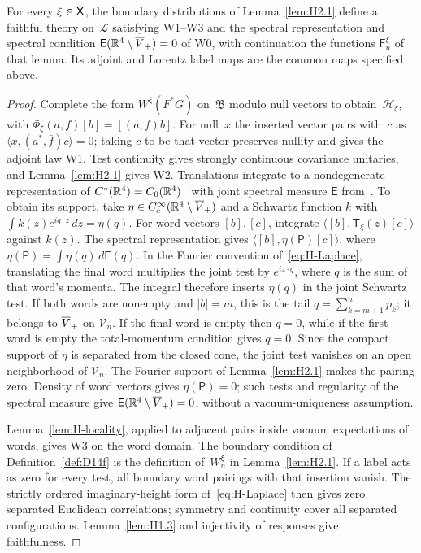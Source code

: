 \begin{lemma}\label{lem:H-fields}
For every $\xi\in\mathsf{X}$, the boundary distributions of Lemma~\ref{lem:H2.1} define a faithful theory on~$\mathcal L$ satisfying W1--W3 and the spectral representation and spectral condition $\mathsf E(\mathbb{R}^4\setminus\overline{V}_+)=0$ of W0, with continuation the functions $\mathsf F^\xi_n$ of that lemma. Its adjoint and Lorentz label maps are the common maps specified above.
\end{lemma}
\begin{proof}
Complete the form $W^\xi(F^*G)$ on~$\mathfrak B$ modulo null vectors to obtain~$\mathcal H_\xi$, with $\Phi_\xi(a,f)[b]=[(a,f)b]$. For null~$x$ the inserted vector pairs with~$c$ as $\langle x,(a^*,\bar f)c\rangle=0$; taking $c$ to be that vector preserves nullity and gives the adjoint law W1. Test continuity gives strongly continuous covariance unitaries, and Lemma~\ref{lem:H2.1} gives W2. Translations integrate to a nondegenerate representation of $C^*(\mathbb{R}^4)=C_0(\mathbb{R}^4)$~\cite[Theorem~3.7.11 and equation~(3.89)]{Landsman1998} with joint spectral measure $\mathsf E$ from~\cite[Proposition~4.2.3]{Landsman1998}. To obtain its support, take $\eta\in C_c^\infty(\mathbb{R}^4\setminus\overline{V}_+)$ and a Schwartz function $k$ with $\int k(z)e^{iq\cdot z}\,dz=\eta(q)$. For word vectors $[b],[c]$, integrate $\langle[b],\mathsf T_\xi(z)[c]\rangle$ against $k(z)$. The spectral representation gives $\langle[b],\eta(\mathsf P)[c]\rangle$, where $\eta(\mathsf P)=\int\eta(q)\,d\mathsf E(q)$. In the Fourier convention of~\eqref{eq:H-Laplace}, translating the final word multiplies the joint test by $e^{iz\cdot q}$, where $q$ is the sum of that word's momenta. The integral therefore inserts $\eta(q)$ in the joint Schwartz test. If both words are nonempty and $|b|=m$, this is the tail $q=\sum_{k=m+1}^n p_k$; it belongs to $\overline{V}_+$ on $\mathcal V_n$. If the final word is empty then $q=0$, while if the first word is empty the total-momentum condition gives $q=0$. Since the compact support of $\eta$ is separated from the closed cone, the joint test vanishes on an open neighborhood of $\mathcal V_n$. The Fourier support of Lemma~\ref{lem:H2.1} makes the pairing zero. Density of word vectors gives $\eta(\mathsf P)=0$; such tests and regularity of the spectral measure give $\mathsf E(\mathbb{R}^4\setminus\overline{V}_+)=0$, without a vacuum-uniqueness assumption.

Lemma~\ref{lem:H-locality}, applied to adjacent pairs inside vacuum expectations of words, gives W3 on the word domain. The boundary condition of Definition~\ref{def:D14f} is the definition of~$W^\xi_n$ in Lemma~\ref{lem:H2.1}. If a label acts as zero for every test, all boundary word pairings with that insertion vanish. The strictly ordered imaginary-height form of~\eqref{eq:H-Laplace} then gives zero separated Euclidean correlations; symmetry and continuity cover all separated configurations. Lemma~\ref{lem:H1.3} and injectivity of responses give faithfulness.
\end{proof}


